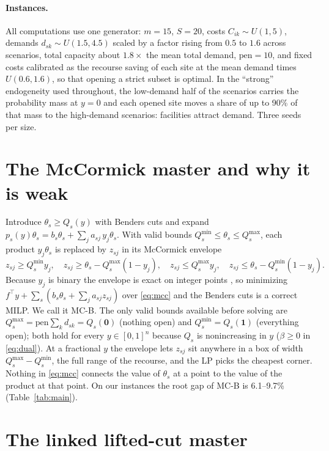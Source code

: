 \documentclass[11pt]{article}
\newcommand{\pen}{\mathrm{pen}}
\newcommand{\T}{^{\top}}
\begin{document}
\paragraph{Instances.} All computations use one generator: $m = 15$, $S = 20$, costs $C_{ik}\sim U(1,5)$, demands
$d_{sk}\sim U(1.5,4.5)$ scaled by a factor rising from $0.5$ to $1.6$ across scenarios, total capacity about
$1.8\times$ the mean total demand, $\pen = 10$, and fixed costs calibrated as the recourse saving of each site at the
mean demand times $U(0.6,1.6)$, so that opening a strict subset is optimal. In the ``strong'' endogeneity used
throughout, the low-demand half of the scenarios carries the probability mass at $y = 0$ and each opened site moves a
share of up to 90\% of that mass to the high-demand scenarios: facilities attract demand. Three seeds per size.

\section{The McCormick master and why it is weak}\label{sec:mcc}

Introduce $\theta_s \ge Q_s(y)$ with Benders cuts and expand
$p_s(y)\theta_s = b_s\theta_s + \sum_j a_{sj}\,y_j\theta_s$. With valid bounds $Q_s^{\min}\le\theta_s\le Q_s^{\max}$,
each product $y_j\theta_s$ is replaced by $z_{sj}$ in its McCormick envelope
\begin{equation}\label{eq:mcc}
z_{sj} \ge Q_s^{\min}y_j,\quad z_{sj}\ge \theta_s - Q_s^{\max}(1-y_j),\quad
z_{sj}\le Q_s^{\max}y_j,\quad z_{sj}\le \theta_s - Q_s^{\min}(1-y_j).
\end{equation}
Because $y_j$ is binary the envelope is exact on integer points \cite{basciftci}, so minimizing
$f\T y + \sum_s (b_s\theta_s + \sum_j a_{sj}z_{sj})$ over \eqref{eq:mcc} and the Benders cuts is a correct MILP. We
call it \textsc{MC-B}. The only valid bounds available before solving are $Q_s^{\max} = \pen\sum_k d_{sk} = Q_s(\mathbf 0)$
(nothing open) and $Q_s^{\min} = Q_s(\mathbf 1)$ (everything open); both hold for every $y\in[0,1]^n$ because
$Q_s$ is nonincreasing in $y$ ($\beta\ge0$ in \eqref{eq:dual}). At a fractional $y$ the envelope lets $z_{sj}$ sit anywhere
in a box of width $Q_s^{\max}-Q_s^{\min}$, the full range of the recourse, and the LP picks the cheapest corner.
Nothing in \eqref{eq:mcc} connects the value of $\theta_s$ at a point to the value of the product at that point. On
our instances the root gap of \textsc{MC-B} is 6.1--9.7\% (Table~\ref{tab:main}).

\section{The linked lifted-cut master}\label{sec:linked}
\end{document}
